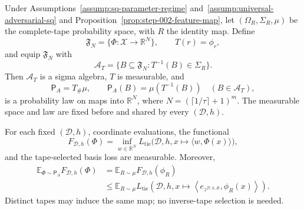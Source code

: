 \begin{proposition}
\label{prop:step-002-preinstance-law}
Under Assumptions~\ref{assump:sq-parameter-regime}
and~\ref{assump:universal-adversarial-sq} and
Proposition~\ref{prop:step-002-feature-map}, let
\((\Omega_R,\Sigma_R,\mu)\) be the complete-tape probability space, with
\(R\) the identity map.  Define
\[
\mathfrak F_N=\{\Phi:\mathcal X\to\mathbb R^N\},
\qquad
T(r)=\phi_r,
\]
and equip \(\mathfrak F_N\) with
\[
\mathscr A_T
=\{B\subseteq\mathfrak F_N:T^{-1}(B)\in\Sigma_R\}.
\tag{A.9}\label{eq:final-sigma-algebra}
\]
Then \(\mathscr A_T\) is a sigma algebra, \(T\) is measurable, and
\[
\mathsf P_A=T_{\#}\mu,
\qquad
\mathsf P_A(B)=\mu(T^{-1}(B))
\quad(B\in\mathscr A_T),
\tag{A.10}\label{eq:pushforward-law}
\]
is a probability law on maps into \(\mathbb R^N\), where
\(N=(\lceil1/\tau\rceil+1)^m\).  The measurable space and law are fixed
before and shared by every \((\mathcal D,h)\).

For each fixed \((\mathcal D,h)\), coordinate evaluations, the functional
\[
F_{\mathcal D,h}(\Phi)
=\inf_{w\in\mathbb R^N}
L_{\mathrm{tie}}\bigl(\mathcal D,h,
x\mapsto\langle w,\Phi(x)\rangle\bigr),
\tag{A.11}\label{eq:optimal-map-loss}
\]
and the tape-selected basis loss are measurable.  Moreover,
\[
\begin{aligned}
\mathbb E_{\Phi\sim\mathsf P_A}F_{\mathcal D,h}(\Phi)
&=\mathbb E_{R\sim\mu}F_{\mathcal D,h}(\phi_R)\\
&\le \mathbb E_{R\sim\mu}
L_{\mathrm{tie}}\!\left(
\mathcal D,h,
x\mapsto\left\langle
e_{z^{\mathcal D,h,R}},\phi_R(x)
\right\rangle\right).
\end{aligned}
\tag{A.12}\label{eq:measurable-candidate-interface}
\]
Distinct tapes may induce the same map; no inverse-tape selection is needed.
\end{proposition}

